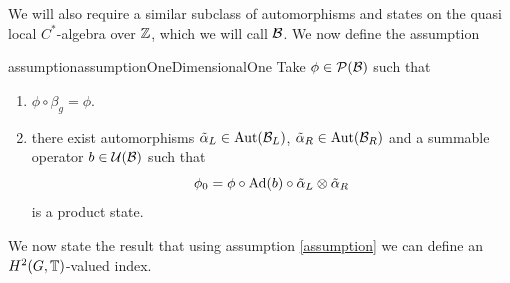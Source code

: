\documentclass[12pt,a4paper,twoside]{article}
\numberwithin{equation}{section}
\begin{document}
We will also require a similar subclass of automorphisms and states on the quasi local $C^*$-algebra over $\mathbb Z$, which we will call $\mathcal B$. We now define the assumption
\begin{restatable}{assumption}{assumptionOneDimensionalOne}\label{assumption1d}
	Take $\phi\in\mathcal P(\mathcal B)$ such that
	\begin{enumerate}
		\item $\phi\circ\beta_g=\phi$.
		\item there exist automorphisms $\tilde\alpha_L\in\Aut{\BB_L}$, $\tilde\alpha_R\in\Aut{\BB_R}$ and a summable operator $b\in\mathcal U(\mathcal B)$ such that
		\begin{equation}
			\phi_0=\phi\circ\Ad{b}\circ\tilde\alpha_{L}\otimes\tilde\alpha_{R}
		\end{equation}
		is a product state.
	\end{enumerate}
\end{restatable}
We now state the result that using assumption \ref{assumption} we can define an $H^2(G,\mathbb T)$-valued index.
\end{document}
